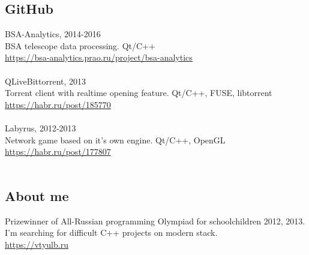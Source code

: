 \documentclass[a4paper, 12pt]{article}
\begin{document}
{    \subsection*{GitHub} {    
        BSA-Analytics, 2014-2016 \\
        BSA telescope data processing. Qt/C++ \\
        \href{https://bsa-analytics.prao.ru/project/bsa-analytics}{https://bsa-analytics.prao.ru/project/bsa-analytics} \\ \\
        QLiveBittorrent, 2013 \\
        Torrent client with realtime opening feature. Qt/C++, FUSE, libtorrent \\
        \href{https://habr.ru/post/185770}{https://habr.ru/post/185770}\\ \\
        Labyrus, 2012-2013 \\
        Network game based on it's own engine. Qt/C++, OpenGL \\
        \href{https://habr.ru/post/177807}{https://habr.ru/post/177807}\\ \\
    }
    
    \subsection*{About me} {
        Prizewinner of All-Russian programming Olympiad for schoolchildren 2012, 2013. \\
        I'm searching for difficult C++ projects on modern stack. \\
        \href{https://vtyulb.ru}{https://vtyulb.ru} \\
    }
}
\end{document}
